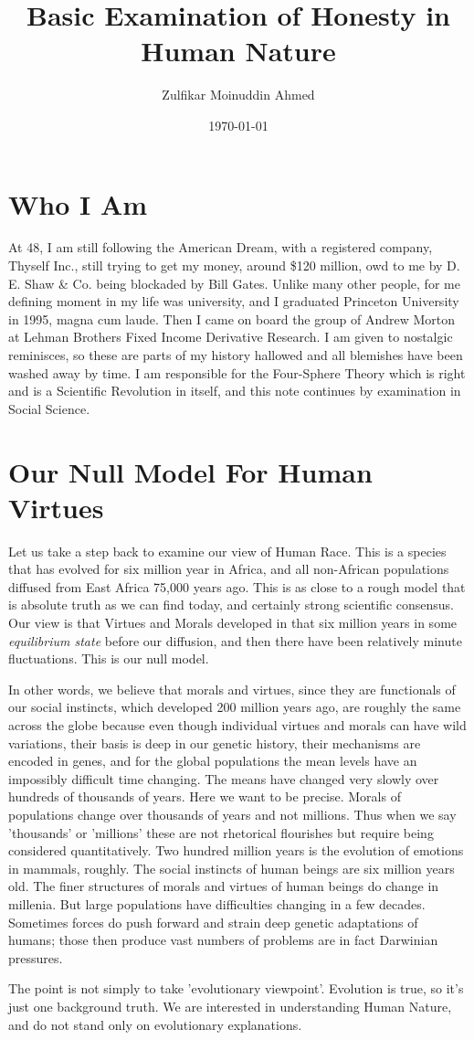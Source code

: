 \documentclass{amsart}
\title{Basic Examination of Honesty in Human Nature}
\author{Zulfikar Moinuddin Ahmed}
\date{\today}
\begin{document}
\maketitle

\section{Who I Am}
At 48, I am still following the American Dream, with a registered company,  Thyself Inc., still trying to get my money, around \$120 million, owd to me by D. E. Shaw \& Co. being blockaded by Bill Gates.  Unlike many other people, for me defining moment in my life was university, and I graduated Princeton University in 1995, magna cum laude.  Then I came on board the group of Andrew Morton at Lehman Brothers Fixed Income Derivative Research.  I am given to nostalgic reminisces, so these are parts of my history hallowed and all blemishes have been washed away by time.  I am responsible for the Four-Sphere Theory which is right and is a Scientific Revolution in itself, and this note continues by examination in Social Science.

\section{Our Null Model For Human Virtues}

Let us take a step back to examine our view of Human Race.  This is a species that has evolved for six million year in Africa, and all non-African populations diffused from East Africa 75,000 years ago.  This is as close to a rough model that is absolute truth as we can find today, and certainly strong scientific consensus.  Our view is that Virtues and Morals developed in that six million years in some {\em equilibrium state} before our diffusion, and then there have been relatively minute fluctuations.  This is our null model.  

In other words, we believe that morals and virtues, since they are functionals of our social instincts, which developed 200 million years ago, are roughly the same across the globe because even though individual virtues and morals can have wild variations, their basis is deep in our genetic history, their mechanisms are encoded in genes, and for the global populations the mean levels have an impossibly difficult time changing.  The means have changed very slowly over hundreds of thousands of years.  Here we want to be precise.  Morals of populations change over thousands of years and not millions.  Thus when we say 'thousands' or 'millions' these are not rhetorical flourishes but require being considered quantitatively.  Two hundred million years is the evolution of emotions in mammals, roughly.  The social instincts of human beings are six million years old.  The finer structures of morals and virtues of human beings do change in millenia.  But large populations have difficulties changing in a few decades.  Sometimes forces do push forward and strain deep genetic adaptations of humans; those then produce vast numbers of problems are in fact Darwinian pressures.  

The point is not simply to take 'evolutionary viewpoint'.  Evolution is true, so it's just one background truth.  We are interested in understanding Human Nature, and do not stand only on evolutionary explanations.
\end{document}
